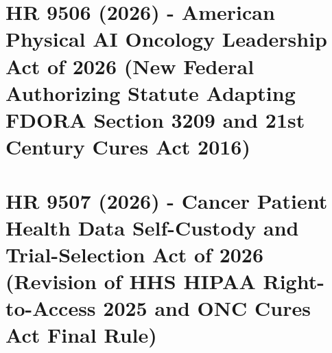 \documentclass[11pt,letterpaper]{article}
\begin{document}
\section{HR 9506 (2026) - American Physical AI Oncology Leadership Act of 2026 (New Federal Authorizing Statute Adapting FDORA Section 3209 and 21st Century Cures Act 2016)}
\label{sec:hr9506}

\newpage

\section{HR 9507 (2026) - Cancer Patient Health Data Self-Custody and Trial-Selection Act of 2026 (Revision of HHS HIPAA Right-to-Access 2025 and ONC Cures Act Final Rule)}
\label{sec:hr9507}

\newpage

\begingroup
\raggedright
\printbibliography[title={References}]
\endgroup
{}
\newpage


\end{document}
